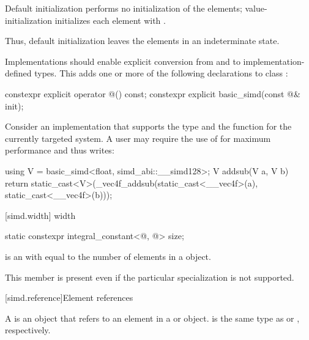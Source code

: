 \pnum
Default initialization performs no initialization of the elements;
value-initialization initializes each element with .
\begin{note}Thus, default initialization leaves the elements in an indeterminate state.\end{note}

\pnum
Implementations should enable explicit conversion from and to implementation-defined types. This adds one or more of the following declarations to class :

\begin{codeblock}
constexpr explicit operator @\impdef@() const;
constexpr explicit basic_simd(const @\impdef@& init);
\end{codeblock}

\begin{example}
  Consider an implementation that supports the type  and the function  for the currently targeted system.
  A user may require the use of  for maximum performance and thus writes:
  \begin{codeblock}
    using V = basic_simd<float, simd_abi::__simd128>;
    V addsub(V a, V b) {
      return static_cast<V>(_vec4f_addsub(static_cast<__vec4f>(a), static_cast<__vec4f>(b)));
    }
  \end{codeblock}
\end{example}

[simd.width]{ width}

\begin{itemdecl}
static constexpr integral_constant<@\simdsizetype@, @\seebelow@> size;
\end{itemdecl}

\begin{itemdescr}
    \pnum {} is an  with  equal to the number of elements in a  object.
    \pnum \begin{note}This member is present even if the particular  specialization is not supported.\end{note}
\end{itemdescr}

[simd.reference]{Element references}

\pnum
A  is an object that refers to an element in a  or  object.  is the same type as  or , respectively.

